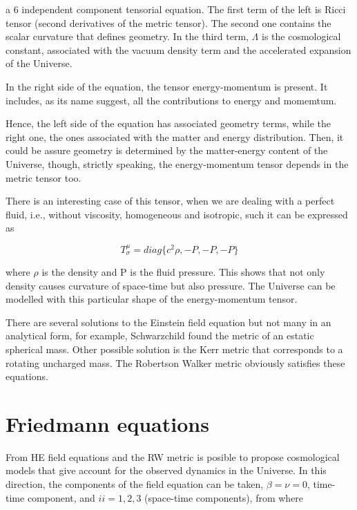 
a 6 independent component tensorial equation. The first term of the left
is Ricci tensor (second derivatives of the metric tensor). The second one 
contains the scalar curvature that defines geometry. 
In the third term, $\Lambda$ is the cosmological constant, associated with
the vacuum density term and the accelerated expansion of the Universe.  

In the right side of the equation, the tensor energy-momentum is present.
It includes, as its name suggest, all the contributions to energy and momemtum. 

Hence, the left side of the equation has associated geometry terms, 
while the right one, the ones associated with the matter and energy distribution. 
Then, it could be assure geometry is determined by the matter-energy content 
of the Universe, though, strictly speaking, the energy-momentum tensor depends
in the metric tensor too. 

There is an interesting case of this tensor, when we are dealing with a perfect 
fluid, i.e., without viscosity, homogeneous and isotropic, such it can be expressed
as 

\[T^{\mu}_{\sigma}= diag\{c^2\rho,-P,-P,-P\}\]

where $\rho$ is the density and P is the fluid pressure. 
This shows that not only density causes curvature of space-time 
but also pressure. The Universe can be modelled with this particular
shape of the energy-momentum tensor. 

There are several solutions to the Einstein field equation but not
many in an analytical form, for example, Schwarzchild found the metric
of an estatic spherical mass. Other possible solution is the Kerr 
metric that corresponds to a rotating uncharged mass. The Robertson
Walker metric obviously satisfies these equations. 
	

\section{ Friedmann equations }


From HE field equations and the RW metric is posible to propose 
cosmological models that give account for the observed dynamics
in the Universe. In this direction, the components of the 
field equation can be taken, $\beta=\nu= 0$, time-time component,
and $ii=1,2,3$ (space-time components), from where

